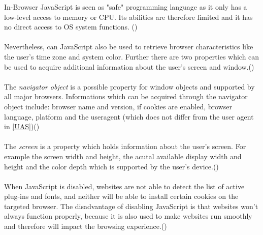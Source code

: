 In-Browser JavaScript is seen as "safe" programming language as it only has a low-level access to memory or CPU. Its abilities are therefore limited and it has no direct access to OS system functions. (\textcite{jsinfo})\\\\
Nevertheless, can JavaScript also be used to retrieve browser characteristics like the user's time zone and system color. Further there are two properties which can be used to acquire additional information about the user's screen and window.(\textcite{web17})\\\\
The \textit{navigator object} is a possible property for window objects and supported by all major browsers. Informations which can be acquired through the navigator object include: browser name and version, if cookies are enabled, browser language, platform and the useragent (which does not differ from the user agent in \autoref{UAS})(\textcite{web17})\\\\
The \textit{screen} is a property which holds information about the user's screen. For example the screen width and height, the acutal available display width and height and the color depth which is supported by the user's device.(\textcite{web17})\\\\
When JavaScript is disabled, websites are not able to detect the list of active plug-ins and fonts, and neither will be able to install certain cookies on the targeted browser. The disadvantage of disabling JavaScript is that websites won’t always function properly, because it is also used to make websites run smoothly and therefore will impact the browsing experience.(\textcite{pixel18})



